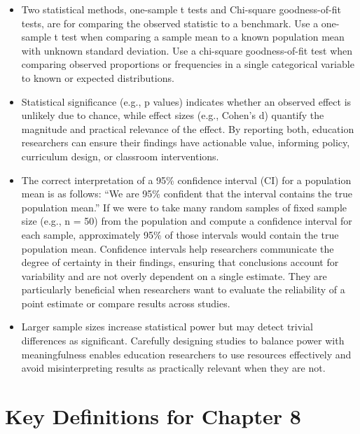 \documentclass[
  letterpaper,
  DIV=11,
  numbers=noendperiod]{scrreprt}
\begin{document}
\begin{itemize}
\item
  Two statistical methods, one-sample t tests and Chi-square
  goodness-of-fit tests, are for comparing the observed statistic to a
  benchmark. Use a one-sample t test when comparing a sample mean to a
  known population mean with unknown standard deviation. Use a
  chi-square goodness-of-fit test when comparing observed proportions or
  frequencies in a single categorical variable to known or expected
  distributions.
\item
  Statistical significance (e.g., p values) indicates whether an
  observed effect is unlikely due to chance, while effect sizes (e.g.,
  Cohen's d) quantify the magnitude and practical relevance of the
  effect. By reporting both, education researchers can ensure their
  findings have actionable value, informing policy, curriculum design,
  or classroom interventions.
\item
  The correct interpretation of a 95\% confidence interval (CI) for a
  population mean is as follows: ``We are 95\% confident that the
  interval contains the true population mean.'' If we were to take many
  random samples of fixed sample size (e.g., n = 50) from the population
  and compute a confidence interval for each sample, approximately 95\%
  of those intervals would contain the true population mean. Confidence
  intervals help researchers communicate the degree of certainty in
  their findings, ensuring that conclusions account for variability and
  are not overly dependent on a single estimate. They are particularly
  beneficial when researchers want to evaluate the reliability of a
  point estimate or compare results across studies.
\item
  Larger sample sizes increase statistical power but may detect trivial
  differences as significant. Carefully designing studies to balance
  power with meaningfulness enables education researchers to use
  resources effectively and avoid misinterpreting results as practically
  relevant when they are not.
\end{itemize}

\section*{Key Definitions for Chapter
8}\label{key-definitions-for-chapter-8}

\end{document}
